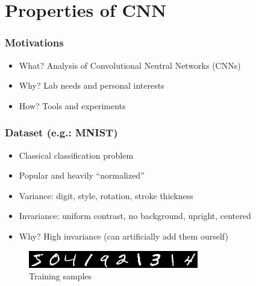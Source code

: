 \documentclass[10pt]{beamer}
\author{\docauthor}
\title{\docsubtitle}
\newcommand{\doctitle}{Properties of CNN}
\newcommand{\eg}{e.g.}
\begin{document}
\section{\doctitle}

\begin{frame}
    \frametitle{Motivations}
    \begin{itemize}
        \item What? Analysis of Convolutional Neutral Networks (CNNs)
        \item Why? Lab needs and personal interests
        \item How? Tools and experiments
    \end{itemize}
\end{frame}

\begin{frame}
    \frametitle{Dataset (\eg: MNIST)}
    \begin{itemize}
        \item Classical classification problem
        \item Popular and heavily ``normalized''
        \item Variance: digit, style, rotation, stroke thickness
        \item Invariance: uniform contrast, no background, upright, centered
        \item Why? High invariance (can artificially add them ourself)
    \end{itemize}

    \begin{figure}[h]
        \begin{center}
            \includegraphics{midpres_figures/mnist.png}
        \end{center}
        \caption{Training samples}
    \end{figure}
\end{frame}
\end{document}
